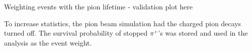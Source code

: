 Weighting events with the pion lifetime - validation plot here

\begin{figure}[H]
  \caption{
    \label{fig:pion_lifetime}
  }
\end{figure}

To increase statistics, the pion beam simulation had the charged pion decays turned off.
The survival probability of stopped $\pi^+$'s was stored and used in the analysis
as the event weight.

